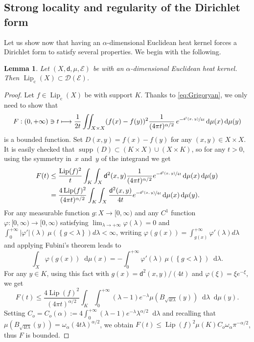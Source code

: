\documentclass[10pt]{amsart}
\newcommand\mto{\mathchoice{\longmapsto}{\mapsto}{\mapsto}{\mapsto}}
\newcommand{\rmc}{\mathrm{c}}
\let\sep:
\theoremstyle{plain}
\newtheorem{lemma}[theorem]{Lemma}
\theoremstyle{definition}
\newcommand{\cE}{\mathcal{E}}
\newcommand{\cD}{\mathcal{D}}
\let\phi\varphi
\newcommand{\di}{\mathop{}\!\mathrm{d}}
\DeclareMathOperator{\supp}{supp}
\DeclareMathOperator{\Lip}{Lip}
\newcommand{\dist}{\mathsf{d}}
\begin{document}
\subsection{Strong locality and regularity of the Dirichlet form}

Let us show now that having an $\alpha$-dimensional Euclidean heat kernel forces a Dirichlet form to satisfy several properties. We begin with the following.

\begin{lemma}\label{lem:lipinD}
Let $(X,\dist,\mu,\cE)$ be with an $\alpha$-dimensional Euclidean heat kernel. Then $\Lip_\rmc(X) \subset \cD(\cE)$.
\end{lemma}

\begin{proof}
Let $f \in \Lip_\rmc(X)$ be with support $K$. Thanks to \eqref{eq:Grigoryan}, we only need to show that
\[
F \sep (0,+\infty) \ni t \mto \frac{1}{2t} \iint_{X\times X} (f(x)-f(y))^2 \frac{1}{(4 \pi t)^{\alpha/2}}\, e^{-\sfrac{\dist^2(x,y)}{4t}} \di \mu(x) \di \mu(y)
\]
is a bounded function. Set $D(x,y)=f(x)-f(y)$ for any $(x,y) \in X \times X$. It is easily checked that $\supp(D) \subset (K \times X) \cup (X \times K)$, so for any $t>0$, using the symmetry in~$x$ and~$y$ of the integrand we get
\begin{align*}
F(t) & \le \frac{\Lip(f)^2}{t} \int_K\int_X \dist^2(x,y) \frac{1}{(4 \pi t)^{\alpha/2}} e^{-\sfrac{\dist^2(x,y)}{4t}} \di \mu(x) \di \mu(y)\\
& = \frac{4 \Lip(f)^2}{(4 \pi t)^{\alpha/2}} \int_K \int_X \frac{\dist^2(x,y)}{4t} e^{-\sfrac{\dist^2(x,y)}{4t}} \di \mu(x) \di \mu(y).
\end{align*}
For any measurable function $g:X\to [0,\infty)$ and any $C^1$ function $\phi: [0,\infty) \to[0,\infty)$ satisfying $\lim_{\lambda\to+\infty}\varphi(\lambda)=0$ and $\int_0^{+\infty} |\varphi'|(\lambda)\ \mu\left(\left\{g<\lambda\right\}\right)d\lambda<\infty$, writing $\varphi(g(x))=\int_{g(x)}^{+\infty} \varphi'(\lambda)d\lambda$ and applying Fubini's theorem leads to
\begin{equation}\label{eq:Fub}
\int_X \varphi(g(x))\di\mu(x)=-\int_0^{+\infty} \varphi'(\lambda)\ \mu\left(\left\{g<\lambda\right\}\right)\di\lambda.
\end{equation}
For any $y \in K$, using this fact with $g(x)=\dist^2(x,y)/(4t)$ and $\phi(\xi)=\xi e^{-\xi}$, we get
\[
F(t) \le \frac{4 \Lip(f)^2}{(4 \pi t)^{\alpha/2}} \int_K \int_0^{+\infty} (\lambda - 1) e^{-\lambda} \mu(B_{\sqrt{4 t \lambda}}(y)) \di \lambda \di \mu(y).
\]
Setting $C_o=C_o(\alpha):=4 \int_0^{+\infty}(\lambda-1)e^{-\lambda}\lambda^{\alpha/2} \di \lambda$ and recalling that $\mu(B_{\sqrt{4 t \lambda}}(y))= \omega_{\alpha} (4 t \lambda)^{\alpha/2}$, we obtain $F(t) \le \Lip(f)^2 \mu(K) C_o \omega_{\alpha} \pi^{-\alpha/2}$, thus $F$ is bounded.
\end{proof}
\end{document}
